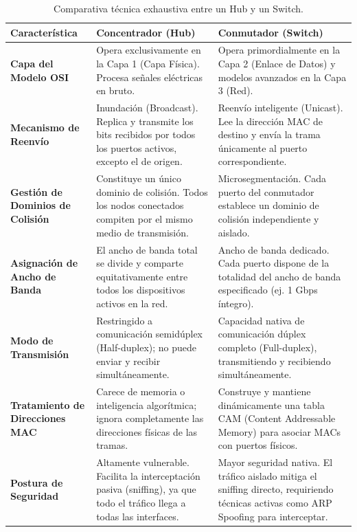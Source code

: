 \documentclass[a4paper,12pt]{article}
\begin{document}
\begin{table}[H]
    \centering
    \renewcommand{\arraystretch}{1.5}
    \begin{tabular}{|p{3.5cm}|p{5.5cm}|p{5.5cm}|}
        \hline
        \textbf{Característica} & \textbf{Concentrador (Hub)} & \textbf{Conmutador (Switch)} \\ \hline
        \textbf{Capa del Modelo OSI} & Opera exclusivamente en la Capa 1 (Capa Física). Procesa señales eléctricas en bruto. & Opera primordialmente en la Capa 2 (Enlace de Datos) y modelos avanzados en la Capa 3 (Red). \\ \hline
        \textbf{Mecanismo de Reenvío} & Inundación (Broadcast). Replica y transmite los bits recibidos por todos los puertos activos, excepto el de origen. & Reenvío inteligente (Unicast). Lee la dirección MAC de destino y envía la trama únicamente al puerto correspondiente. \\ \hline
        \textbf{Gestión de Dominios de Colisión} & Constituye un único dominio de colisión. Todos los nodos conectados compiten por el mismo medio de transmisión. & Microsegmentación. Cada puerto del conmutador establece un dominio de colisión independiente y aislado. \\ \hline
        \textbf{Asignación de Ancho de Banda} & El ancho de banda total se divide y comparte equitativamente entre todos los dispositivos activos en la red. & Ancho de banda dedicado. Cada puerto dispone de la totalidad del ancho de banda especificado (ej. 1 Gbps íntegro). \\ \hline
        \textbf{Modo de Transmisión} & Restringido a comunicación semidúplex (Half-duplex); no puede enviar y recibir simultáneamente. & Capacidad nativa de comunicación dúplex completo (Full-duplex), transmitiendo y recibiendo simultáneamente. \\ \hline
        \textbf{Tratamiento de Direcciones MAC} & Carece de memoria o inteligencia algorítmica; ignora completamente las direcciones físicas de las tramas. & Construye y mantiene dinámicamente una tabla CAM (Content Addressable Memory) para asociar MACs con puertos físicos. \\ \hline
        \textbf{Postura de Seguridad} & Altamente vulnerable. Facilita la interceptación pasiva (sniffing), ya que todo el tráfico llega a todas las interfaces. & Mayor seguridad nativa. El tráfico aislado mitiga el sniffing directo, requiriendo técnicas activas como ARP Spoofing para interceptar. \\ \hline
    \end{tabular}
    \caption{Comparativa técnica exhaustiva entre un Hub y un Switch.}
\end{table}
\end{document}
